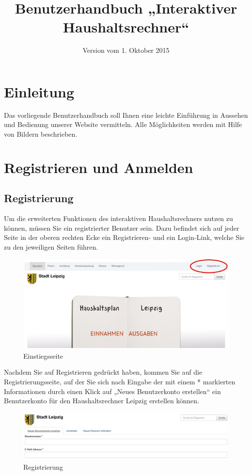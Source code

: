 \documentclass[a4paper,11pt,twoside]{article}
\title{Benutzerhandbuch „Interaktiver Haushaltsrechner“}
\date{Version vom 1. Oktober 2015}
\begin{document}
\maketitle
\tableofcontents
\newpage
\seitezwei
\newpage

\section{Einleitung}
Das vorliegende Benutzerhandbuch soll Ihnen eine leichte Einf\"uhrung in
Aussehen und Bedienung unserer Website vermitteln. Alle M\"oglichkeiten werden
mit Hilfe von Bildern beschrieben.
\section{Registrieren und Anmelden}
\subsection{Registrierung}
Um die erweiterten Funktionen des interaktiven Haushaltsrechners nutzen zu
können, müssen Sie ein registrierter Benutzer sein. Dazu befindet sich auf
jeder Seite in der oberen rechten Ecke ein Registrieren- und ein Login-Link,
welche Sie zu den jeweiligen Seiten f\"uhren.
\begin{figure}[ht]
  \begin{center}
    \includegraphics[width=.8\textwidth]{Bilder/anmeldung.jpg}
  \end{center}
  \caption{Einstiegsseite}
\end{figure}

Nachdem Sie auf Registrieren gedr\"uckt haben, kommen Sie auf die
Registrierungsseite, auf der Sie sich nach Eingabe der mit einem * markierten
Informationen durch einen Klick auf „Neues Benutzerkonto erstellen“ ein
Benutzerkonto f\"ur den Haushaltsrechner Leipzig erstellen können.
\begin{figure}[ht]
\begin{center}
  \includegraphics[width=.8\textwidth]{Bilder/registrierung.jpg}
\end{center}
  \caption{Registrierung}
\end{figure}
\end{document}
